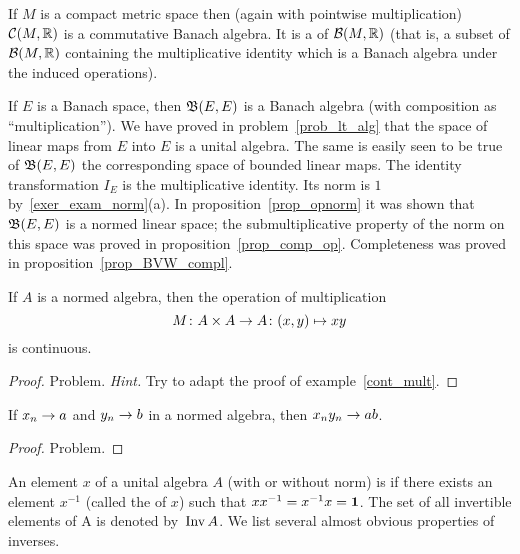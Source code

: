 \begin{exam} If $M$ is a compact metric space then (again with pointwise multiplication)
$\mathcal{C}(M,\mathbb{R})$ is a commutative Banach algebra.  It is a
 of $\mathcal{B}(M,\mathbb{R})$ (that is, a subset of $\mathcal{B}(M,\mathbb{R})$ containing the
multiplicative identity which is a Banach algebra under the induced operations).
\end{exam}

\begin{exam} If $E$ is a Banach space, then $\mathfrak{B}(E,E)$ is a Banach algebra (with
composition as ``multiplication'').  We have proved in problem~\ref{prob_lt_alg} that the
space of linear maps from $E$ into $E$ is a unital algebra.  The same is easily seen to be
true of $\mathfrak{B}(E,E)$ the corresponding space of bounded linear maps.  The identity
transformation $I_E$ is the multiplicative identity.  Its norm is $1$
by~\ref{exer_exam_norm}(a).  In proposition~\ref{prop_opnorm} it was shown that $\mathfrak{B}(E,E)$
is a normed linear space; the submultiplicative property of the norm on this space was proved
in proposition~\ref{prop_comp_op}. Completeness was proved in
proposition~\ref{prop_BVW_compl}.
\end{exam}

\begin{prop}  If $A$ is a normed algebra, then the operation of multiplication
  \[ M \colon A \times A \rightarrow A\colon  (x,y) \mapsto xy \]
is continuous.
\end{prop}

\begin{proof} Problem.   \emph{Hint.}  Try to adapt the proof of example~\ref{cont_mult}.  \ns
\end{proof}

\begin{cor}  If $x_n \rightarrow a$ and $y_n \rightarrow b$ in a normed algebra, then $x_ny_n \rightarrow ab$.
\end{cor}

\begin{proof} Problem.  \ns  \end{proof}

\begin{defn}  An element $x$ of a unital algebra $A$ (with or without norm) is
 if there exists an element
$x^{-1}$ (called the
 of $x$) such that $xx^{-1} = x^{-1}x = \mathbf{1}$.  The set of all
invertible elements of A is denoted
by~$\operatorname{Inv} A$. We list several almost obvious properties of inverses.
\end{defn}


